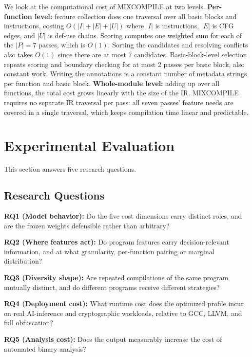 \documentclass[pdflatex,sn-mathphys-num]{sn-jnl}
\theoremstyle{thmstyleone}%
\theoremstyle{thmstyletwo}%
\theoremstyle{thmstylethree}%
\begin{document}
We look at the computational cost of MIXCOMPILE at two levels.
\textbf{Per-function level:} feature collection does one traversal over all basic
blocks and instructions, costing $O(|I| + |E| + |U|)$ where $|I|$ is instructions,
$|E|$ is CFG edges, and $|U|$ is def-use chains. Scoring computes one weighted sum
for each of the $|P| = 7$ passes, which is $O(1)$. Sorting the candidates and
resolving conflicts also takes $O(1)$ since there are at most 7 candidates.
Basic-block-level selection repeats scoring and boundary checking for at most 2
passes per basic block, also constant work. Writing the annotations is a constant
number of metadata strings per function and basic block.
\textbf{Whole-module level:} adding up over all functions, the total cost grows
linearly with the size of the IR. MIXCOMPILE requires no separate IR traversal
per pass: all seven passes' feature needs are covered in a single traversal,
which keeps compilation time linear and predictable.

\section{Experimental Evaluation}

This section answers five research questions.

\subsection{Research Questions}

\textbf{RQ1 (Model behavior):} Do the five cost dimensions carry distinct roles, and
are the frozen weights defensible rather than arbitrary?

\textbf{RQ2 (Where features act):} Do program features carry decision-relevant
information, and at what granularity, per-function pairing or marginal distribution?

\textbf{RQ3 (Diversity shape):} Are repeated compilations of the same program mutually
distinct, and do different programs receive different strategies?

\textbf{RQ4 (Deployment cost):} What runtime cost does the optimized profile incur on
real AI-inference and cryptographic workloads, relative to GCC, LLVM, and full
obfuscation?

\textbf{RQ5 (Analysis cost):} Does the output measurably increase the cost of
automated binary analysis?
\end{document}
